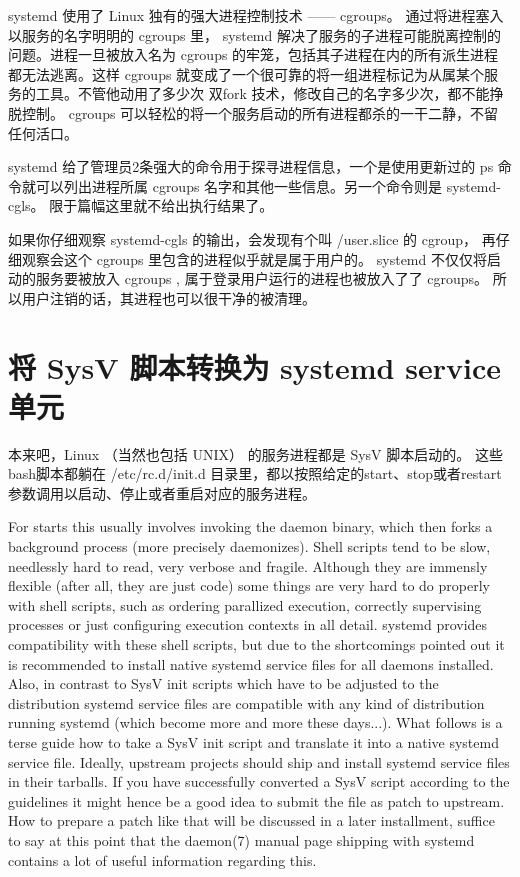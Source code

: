 systemd 使用了 Linux 独有的强大进程控制技术 —— cgroups。 通过将进程塞入以服务的名字明明的 cgroups 里，
systemd 解决了服务的子进程可能脱离控制的问题。进程一旦被放入名为 cgroups 的牢笼，包括其子进程在内的所有派生进程都无法逃离。这样 cgroups 就变成了一个很可靠的将一组进程标记为从属某个服务的工具。不管他动用了多少次 双fork 技术，修改自己的名字多少次，都不能挣脱控制。 cgroups 可以轻松的将一个服务启动的所有进程都杀的一干二静，不留任何活口。

systemd 给了管理员2条强大的命令用于探寻进程信息，一个是使用更新过的 ps 命令就可以列出进程所属 cgroups 名字和其他一些信息。另一个命令则是 systemd-cgls。
限于篇幅这里就不给出执行结果了。

如果你仔细观察 systemd-cgls 的输出，会发现有个叫 /user.slice 的 cgroup， 再仔细观察会这个 cgroups 里包含的进程似乎就是属于用户的。 systemd  不仅仅将启动的服务要被放入 cgroups , 属于登录用户运行的进程也被放入了了 cgroups。 所以用户注销的话，其进程也可以很干净的被清理。

\section{将 SysV 脚本转换为 systemd service 单元}

本来吧，Linux （当然也包括 UNIX） 的服务进程都是 SysV 脚本启动的。
这些bash脚本都躺在 /etc/rc.d/init.d 目录里，都以按照给定的start、stop或者restart参数调用以启动、停止或者重启对应的服务进程。

For starts this usually involves invoking the daemon binary, which then forks a background process (more precisely daemonizes). Shell scripts tend to be slow, needlessly hard to read, very verbose and fragile. Although they are immensly flexible (after all, they are just code) some things are very hard to do properly with shell scripts, such as ordering parallized execution, correctly supervising processes or just configuring execution contexts in all detail. systemd provides compatibility with these shell scripts, but due to the shortcomings pointed out it is recommended to install native systemd service files for all daemons installed. Also, in contrast to SysV init scripts which have to be adjusted to the distribution systemd service files are compatible with any kind of distribution running systemd (which become more and more these days...). What follows is a terse guide how to take a SysV init script and translate it into a native systemd service file. Ideally, upstream projects should ship and install systemd service files in their tarballs. If you have successfully converted a SysV script according to the guidelines it might hence be a good idea to submit the file as patch to upstream. How to prepare a patch like that will be discussed in a later installment, suffice to say at this point that the daemon(7) manual page shipping with systemd contains a lot of useful information regarding this.

